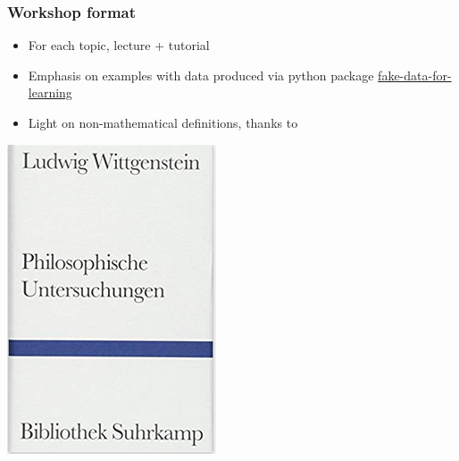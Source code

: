 \begin{frame}
\frametitle{Workshop format}

\begin{itemize}
\item For each topic, lecture + tutorial
\item Emphasis on examples with data produced via python package \href{https://munichpavel.github.io/fake-data-for-learning/}{fake-data-for-learning}
\item Light on non-mathematical definitions, thanks to
\end{itemize}
\centering
\includegraphics[width=0.3\textheight]{graphics/pi_wittgenstein}
\end{frame}

